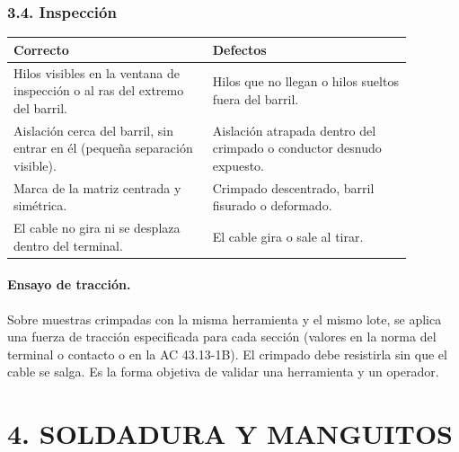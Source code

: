 \subsubsection*{3.4. Inspección}
\begin{center}
\small
\begin{tabular}{|p{0.44\linewidth}|p{0.44\linewidth}|}
\hline
\textbf{Correcto} & \textbf{Defectos} \\ \hline
Hilos visibles en la ventana de inspección o al ras del extremo del barril. & Hilos que no llegan
o hilos sueltos fuera del barril. \\ \hline
Aislación cerca del barril, sin entrar en él (pequeña separación visible). & Aislación atrapada
dentro del crimpado o conductor desnudo expuesto. \\ \hline
Marca de la matriz centrada y simétrica. & Crimpado descentrado, barril fisurado o deformado. \\
\hline
El cable no gira ni se desplaza dentro del terminal. & El cable gira o sale al tirar. \\ \hline
\end{tabular}
\end{center}

\paragraph*{Ensayo de tracción.} Sobre muestras crimpadas con la misma herramienta y el mismo lote,
se aplica una fuerza de tracción especificada para cada sección (valores en la norma del
terminal o contacto o en la AC 43.13-1B). El crimpado debe resistirla sin que el cable se salga. Es
la forma objetiva de validar una herramienta y un operador.

\section*{4. SOLDADURA Y MANGUITOS}

